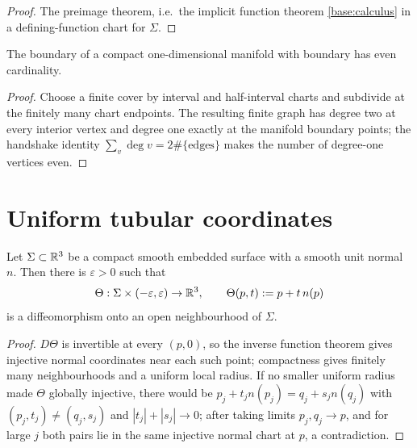 \begin{proof}
The preimage theorem, i.e.\ the implicit function theorem \ref{base:calculus}
in a defining-function chart for $\Sigma$.
\end{proof}

\begin{lemma}
\label{lem:handshake}
The boundary of a compact one-dimensional manifold with boundary has even
cardinality.
\end{lemma}

\begin{proof}
Choose a finite cover by interval and half-interval charts and subdivide at
the finitely many chart endpoints.  The resulting finite graph has degree two
at every interior vertex and degree one exactly at the manifold boundary
points; the handshake identity $\sum_v\deg v=2\#\{\text{edges}\}$ makes the
number of degree-one vertices even.
\end{proof}

\section{Uniform tubular coordinates}\label{sec:tubular}

\begin{theorem}\label{thm:tubular}
Let $\Sigma\subset\mathbb R^3$ be a compact smooth embedded surface with a smooth
unit normal $n$.  Then
there is $\varepsilon>0$ such that
\begin{equation}\label{eq:tubular}
  \Theta:\Sigma\times(-\varepsilon,\varepsilon)\to\mathbb R^3,
  \qquad
  \Theta(p,t):=p+t\,n(p)
\end{equation}
is a diffeomorphism onto an open neighbourhood of $\Sigma$.
\end{theorem}

\begin{proof}
$D\Theta$ is invertible at every $(p,0)$, so the inverse function theorem
gives injective normal coordinates near each such point; compactness gives
finitely many neighbourhoods and a uniform local radius.  If no smaller
uniform radius made $\Theta$ globally injective, there would be
$p_j+t_jn(p_j)=q_j+s_jn(q_j)$ with $(p_j,t_j)\ne(q_j,s_j)$ and
$|t_j|+|s_j|\to0$; after taking limits $p_j,q_j\to p$, and for large $j$ both
pairs lie in the same injective normal chart at $p$, a contradiction.
\end{proof}

